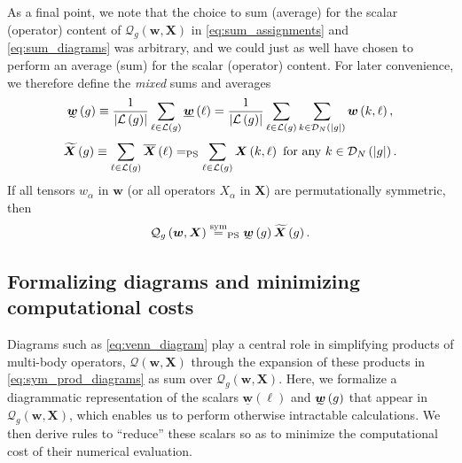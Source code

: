 \documentclass[nofootinbib,notitlepage,11pt]{revtex4-2}
\renewcommand{\t}{\text} %
\newcommand{\f}[2]{\dfrac{#1}{#2}} %
\newcommand{\p}[1]{\left(#1\right)} %
\newcommand{\m}{\bm} %
\newcommand{\1}{\mathds{1}}
\newcommand{\D}{\mathcal{D}}
\renewcommand{\L}{\mathcal{L}}
\newcommand{\Q}{\mathcal{Q}}
\newcommand{\EQPS}{=_{\text{PS}}}
\newcommand{\ut}{\undertilde}
\newcommand{\ot}{\widetilde}
\newcommand{\col}{\underline}
\newcommand{\mean}{\overline}
\begin{document}
As a final point, we note that the choice to sum (average) for the
scalar (operator) content of $\Q_g\p{\m w,\m X}$ in
\eqref{eq:sum_assignments} and \eqref{eq:sum_diagrams} was arbitrary,
and we could just as well have chosen to perform an average (sum) for
the scalar (operator) content.  For later convenience, we therefore
define the {\it mixed} sums and averages
\begin{align}
  \ut{\m w}\p{g} \equiv \f1{\abs{\L\p{g}}}
  \sum_{\ell\in\L\p{g}} \col{\m w}\p{\ell}
  = \f1{\abs{\L\p{g}}} \sum_{\ell\in\L\p{g}}
  \sum_{k\in\D_N\p{\abs{g}}} \m w\p{k,\ell},
\end{align}
\begin{align}
  \ot{\m X}\p{g} \equiv \sum_{\ell\in\L\p{g}} \mean{\m X}\p{\ell}
  \EQPS \sum_{\ell\in\L\p{g}} \m X\p{k,\ell}
  ~\t{for any}~ k\in\D_N\p{\abs{g}}.
\end{align}
If all tensors $w_\alpha$ in $\m w$ (or all operators $X_\alpha$ in
$\m X$) are permutationally symmetric, then
\begin{align}
  \Q_g\p{\m w,\m X} \stackrel{\t{sym}}{=}_{\t{PS}}
  \ut{\m w}\p{g} \ot{\m X}\p{g}.
  \label{eq:sum_diagrams_alt}
\end{align}

\subsection{Formalizing diagrams and minimizing computational costs}
\label{sec:diagrams}

Diagrams such as \eqref{eq:venn_diagram} play a central role in
simplifying products of multi-body operators, $\Q\p{\m w,\m X}$
through the expansion of these products in
\eqref{eq:sym_prod_diagrams} as sum over $\Q_g\p{\m w,\m X}$.  Here,
we formalize a diagrammatic representation of the scalars
$\col{\m w}\p{\ell}$ and $\ut{\m w}\p{g}$ that appear in
$\Q_g\p{\m w,\m X}$, which enables us to perform otherwise intractable
calculations.  We then derive rules to ``reduce'' these scalars so as
to minimize the computational cost of their numerical evaluation.
\end{document}

